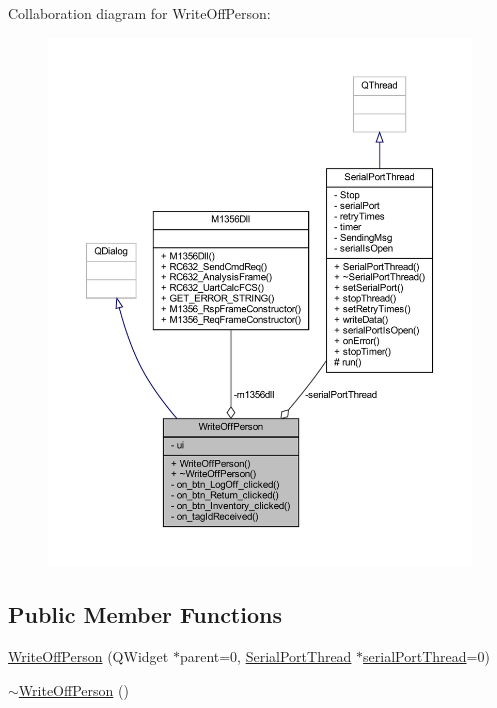 Collaboration diagram for Write\+Off\+Person\+:
\nopagebreak
\begin{figure}[H]
\begin{center}
\leavevmode
\includegraphics[width=350pt]{class_write_off_person__coll__graph}
\end{center}
\end{figure}
\subsection*{Public Member Functions}
\begin{DoxyCompactItemize}
\item 
\mbox{\hyperlink{class_write_off_person_a178b2a3ef17c72d65099154b493e10e5}{Write\+Off\+Person}} (Q\+Widget $\ast$parent=0, \mbox{\hyperlink{class_serial_port_thread}{Serial\+Port\+Thread}} $\ast$\mbox{\hyperlink{class_write_off_person_ac1a66c10d4db76eaf05c2aedff8b26e9}{serial\+Port\+Thread}}=0)
\item 
\mbox{\hyperlink{class_write_off_person_a4804759e30baabd1dc17a0aa57563253}{$\sim$\+Write\+Off\+Person}} ()
\end{DoxyCompactItemize}
